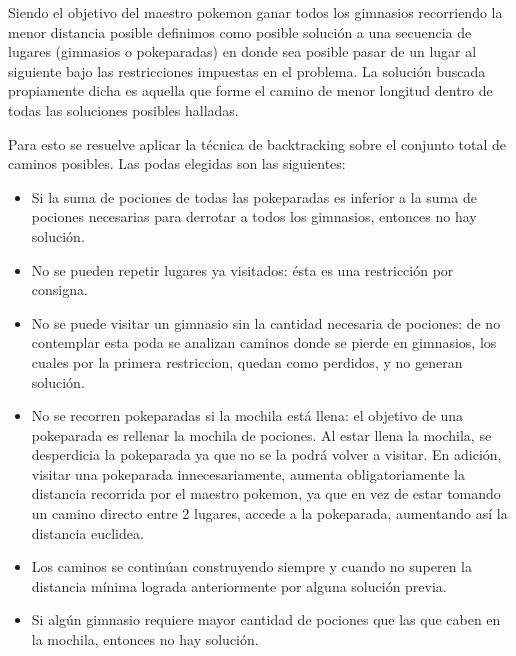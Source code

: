 Siendo el objetivo del maestro pokemon ganar todos los gimnasios recorriendo la menor distancia posible definimos como posible solución a una secuencia de lugares (gimnasios o pokeparadas) en donde sea posible pasar de un lugar al siguiente bajo las restricciones impuestas en el problema. La solución buscada propiamente dicha es aquella que forme el camino de menor longitud dentro de todas las soluciones posibles halladas.

Para esto se resuelve aplicar la técnica de backtracking sobre el conjunto total de caminos posibles. Las podas elegidas son las siguientes:

\begin{itemize}
\item Si la suma de pociones de todas las pokeparadas es inferior a la suma de pociones necesarias para derrotar a todos los gimnasios, entonces no hay solución.
\item No se pueden repetir lugares ya visitados: ésta es una restricción por consigna.
\item No se puede visitar un gimnasio sin la cantidad necesaria de pociones: de no contemplar esta poda se analizan caminos donde se pierde en gimnasios, los cuales por la primera restriccion, quedan como perdidos, y no generan solución.
\item No se recorren pokeparadas si la mochila está llena: el objetivo de una pokeparada es rellenar la mochila de pociones. Al estar llena la mochila, se desperdicia la pokeparada ya que no se la podrá volver a visitar. En adición, visitar una pokeparada innecesariamente, aumenta obligatoriamente la distancia recorrida por el maestro pokemon, ya que en vez de estar tomando un camino directo entre 2 lugares, accede a la pokeparada, aumentando así la distancia euclidea.
\item Los caminos se continúan construyendo siempre y cuando no superen la distancia mínima lograda anteriormente por alguna solución previa.
\item Si algún gimnasio requiere mayor cantidad de pociones que las que caben en la mochila, entonces no hay solución. 

\end{itemize}
